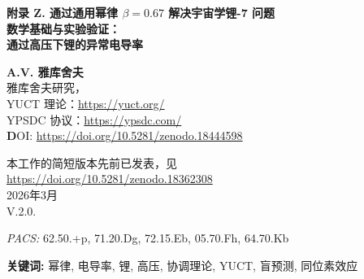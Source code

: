 \documentclass[12pt,a4paper]{article}
\theoremstyle{remark}
\newcommand{\pacs}{\textit{PACS:} 62.50.+p, 71.20.Dg, 72.15.Eb, 05.70.Fh, 64.70.Kb}
\begin{document}
	
	\begin{titlepage}
		\begin{center}
			\vspace*{0cm}
			
			\Huge \textbf{附录 Z. 通过通用幂律 \(\beta = 0.67\) 解决宇宙学锂-7 问题} \\
			\Huge \textbf{数学基础与实验验证：} \\
			\Huge \textbf{通过高压下锂的异常电导率}
			
			\vspace{0.5cm}
			\Large \textbf{A.V. 雅库舍夫} \\
			\large 雅库舍夫研究， \\ 
			YUCT 理论：\url{https://yuct.org/}\\
			YPSDC 协议：\url{https://ypsdc.com/}\\
			
			\vspace{2cm}
			\textbf DOI: \url{https://doi.org/10.5281/zenodo.18444598}\\
			
			\vspace{1cm}
			
			\vspace{0cm}
			\large 
			本工作的简短版本先前已发表，见\\ \url{https://doi.org/10.5281/zenodo.18362308}\\
			\vspace{1cm}
			2026年3月 \\ \large V.2.0.
			
			
			\newpage
			\begin{minipage}{0.85\textwidth}
				\begin{abstract}
					\noindent
					我们提出了通用电导率幂律 \(\sigma \propto (q-1)^{-\beta}\) 的严格数学推导，其中指数 \(\beta = 0.67\)，该幂律源自雅库舍夫统一协调理论 (YUCT)。利用锂在冲击压缩下（高达 210 GPa）的异常电阻率实验数据（Fortov, Yakushev 等，2001 年），我们对模型进行了标定，并证明观测到的 15 倍电阻率增加是协调效应的直接结果。提出了三个盲测实验预测，包括电导率的同位素效应 \(\sigma_6/\sigma_7 = (7/6)^{0.74} \approx 1.115\)，这为该理论提供了决定性的检验。结果将宇宙学锂与实验室测量联系了起来，并确立了 \(\beta = 0.67\) 作为一个新的基本常数。
				\end{abstract}
			\end{minipage}
			
			\vspace{0.5cm}
			\noindent \pacs
			
			\vspace{0.5cm}
			\noindent \textbf{关键词:} 幂律, 电导率, 锂, 高压, 协调理论, YUCT, 盲预测, 同位素效应
		\end{center}
	\end{titlepage}
	
\end{document}
